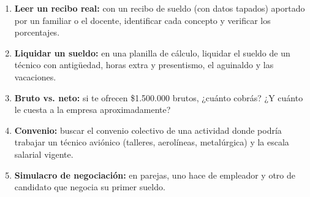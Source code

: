 \begin{enumerate}
  \item \textbf{Leer un recibo real:} con un recibo de sueldo (con datos tapados) aportado por
        un familiar o el docente, identificar cada concepto y verificar los porcentajes.
  \item \textbf{Liquidar un sueldo:} en una planilla de cálculo, liquidar el sueldo de un
        técnico con antigüedad, horas extra y presentismo, el aguinaldo y las vacaciones.
  \item \textbf{Bruto vs. neto:} si te ofrecen \$1.500.000 brutos, ¿cuánto cobrás? ¿Y cuánto le
        cuesta a la empresa aproximadamente?
  \item \textbf{Convenio:} buscar el convenio colectivo de una actividad donde podría
        trabajar un técnico aviónico (talleres, aerolíneas, metalúrgica) y la escala salarial
        vigente.
  \item \textbf{Simulacro de negociación:} en parejas, uno hace de empleador y otro de
        candidato que negocia su primer sueldo.
\end{enumerate}
